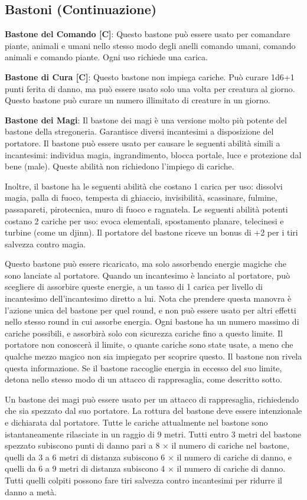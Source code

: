\documentclass{article}
\begin{document}
\begin{multicols}{2}
\section{Bastoni (Continuazione)}

\textbf{Bastone del Comando [C]}: Questo bastone può essere usato per comandare piante, animali e umani nello stesso modo degli anelli comando umani, comando animali e comando piante. Ogni uso richiede una carica.

\textbf{Bastone di Cura [C]}: Questo bastone non impiega cariche. Può curare 1d6+1 punti ferita di danno, ma può essere usato solo una volta per creatura al giorno. Questo bastone può curare un numero illimitato di creature in un giorno.

\textbf{Bastone dei Magi}: Il bastone dei magi è una versione molto più potente del bastone della stregoneria. Garantisce diversi incantesimi a disposizione del portatore. Il bastone può essere usato per causare le seguenti abilità simili a incantesimi: individua magia, ingrandimento, blocca portale, luce e protezione dal bene (male). Queste abilità non richiedono l'impiego di cariche.

Inoltre, il bastone ha le seguenti abilità che costano 1 carica per uso: dissolvi magia, palla di fuoco, tempesta di ghiaccio, invisibilità, scassinare, fulmine, passapareti, pirotecnica, muro di fuoco e ragnatela. Le seguenti abilità potenti costano 2 cariche per uso: evoca elementali, spostamento planare, telecinesi e turbine (come un djinn). Il portatore del bastone riceve un bonus di +2 per i tiri salvezza contro magia.

Questo bastone può essere ricaricato, ma solo assorbendo energie magiche che sono lanciate al portatore. Quando un incantesimo è lanciato al portatore, può scegliere di assorbire queste energie, a un tasso di 1 carica per livello di incantesimo dell'incantesimo diretto a lui. Nota che prendere questa manovra è l'azione unica del bastone per quel round, e non può essere usato per altri effetti nello stesso round in cui assorbe energia. Ogni bastone ha un numero massimo di cariche possibili, e assorbirà solo con sicurezza cariche fino a questo limite. Il portatore non conoscerà il limite, o quante cariche sono state usate, a meno che qualche mezzo magico non sia impiegato per scoprire questo. Il bastone non rivela questa informazione. Se il bastone raccoglie energia in eccesso del suo limite, detona nello stesso modo di un attacco di rappresaglia, come descritto sotto.

Un bastone dei magi può essere usato per un attacco di rappresaglia, richiedendo che sia spezzato dal suo portatore. La rottura del bastone deve essere intenzionale e dichiarata dal portatore. Tutte le cariche attualmente nel bastone sono istantaneamente rilasciate in un raggio di 9 metri. Tutti entro 3 metri del bastone spezzato subiscono punti di danno pari a 8 × il numero di cariche nel bastone, quelli da 3 a 6 metri di distanza subiscono 6 × il numero di cariche di danno, e quelli da 6 a 9 metri di distanza subiscono 4 × il numero di cariche di danno. Tutti quelli colpiti possono fare tiri salvezza contro incantesimi per ridurre il danno a metà.


\end{multicols}
\end{document}
